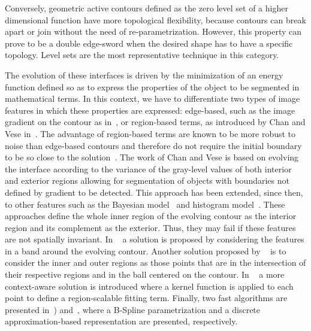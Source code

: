 Conversely, geometric active contours defined as the zero level set of a higher dimensional
function have more topological flexibility, because contours can break apart or join
without the need of re-parametrization. However, this property can prove to be a double edge-sword when the desired shape has to have a specific topology. Level sets are the most representative technique in this category.

 The evolution of these interfaces is driven by the minimization of an energy function
defined so as to express the properties of the object to be segmented in mathematical terms. 
In this context, we have to differentiate two types of image features in which these 
properties are expressed: edge-based, such as the image gradient on the 
contour as in~\cite{Caselles1997}, or region-based terms, as introduced by 
Chan and Vese in~\cite{ChanVese}. The advantage of region-based terms are known to
be more robust to noise than edge-based contours and therefore do not require the initial boundary 
to be so close to the solution~\cite{LlahiColor}. The work of Chan and Vese is based on
evolving the interface according to the variance of the gray-level values of
both interior and exterior regions allowing for segmentation of objects with boundaries
not defined by gradient to be detected. This approach has been extended, since
then, to other features such as the Bayesian model~\cite{Rousson2002} and
histogram model~\cite{Michailovich2007}. These approaches define the
whole inner region of the evolving contour as the interior region and its 
complement as the exterior. Thus, they may fail if these features are not spatially
invariant. In ~\cite{Mille2009} a solution is proposed by considering the features in a 
band around the evolving contour. Another solution proposed by ~\cite{Lankton2008} is
to consider the inner and outer regions as those points that are in the intersection of their respective
regions and in the  ball centered on the contour. In ~\cite{LiTIP08} a more context-aware  solution
is introduced where a kernel function is applied to each point to define a region-scalable
fitting term. Finally, two fast algorithms are presented in~\cite{BernardTIP2009}) 
and~\cite{ShiTIP2008}, where a B-Spline parametrization and a discrete approximation-based 
representation are presented, respectively. 


